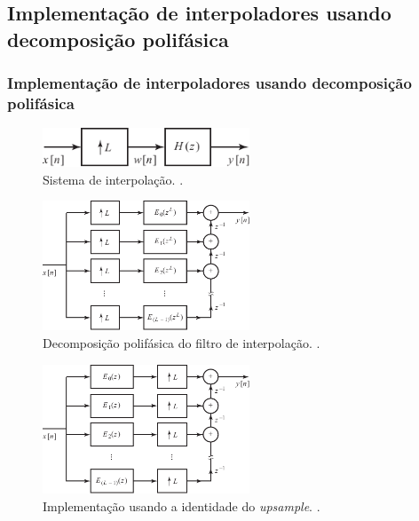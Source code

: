 \subsection{Implementação de interpoladores usando decomposição polifásica}
\begin{frame}[allowframebreaks]
  \frametitle{Implementação de interpoladores usando decomposição polifásica}

        \begin{figure}[h!]
        \centering
        \includegraphics[width=0.55\textwidth]{images/fig441.pdf}
        \caption{Sistema de interpolação. \citep{oppenheim2009}.}
        \label{fig:fig441}
        \end{figure}

        \begin{figure}[h!]
        \centering
        \includegraphics[width=0.55\textwidth]{images/fig442.pdf}
        \caption{Decomposição polifásica do filtro de interpolação. \citep{oppenheim2009}.}
        \label{fig:fig442}
        \end{figure}

        \begin{figure}[h!]
        \centering
        \includegraphics[width=0.55\textwidth]{images/fig443.pdf}
        \caption{Implementação usando a identidade do \textit{upsample}. \citep{oppenheim2009}.}
        \label{fig:fig443}
        \end{figure}

\end{frame}



